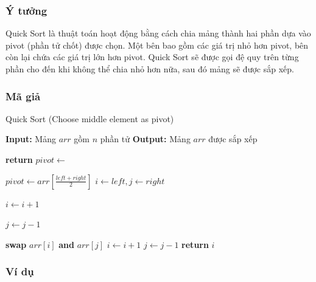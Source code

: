 \subsubsection{Ý tưởng}
Quick Sort là thuật toán hoạt động bằng cách chia mảng thành hai phần dựa vào pivot (phần tử chốt) được chọn. Một bên bao gồm các giá trị nhỏ hơn pivot, bên còn lại chứa các giá trị lớn hơn pivot. Quick Sort sẽ được gọi đệ quy trên từng phần cho đến khi không thể chia nhỏ hơn nữa, sau đó mảng sẽ được sắp xếp.\cite{fasha2021comparative}

\subsubsection{Mã giả}
\begin{algorithm}[H]
\caption{Quick Sort (Choose middle element as pivot)}
\begin{algorithmic}[1]
    \State \textbf{Input:} Mảng $arr$ gồm $n$ phần tử
    \State \textbf{Output:} Mảng $arr$ được sắp xếp
    \State {}
\EndProcedure

        \State \textbf{return}
    \EndIf
    \State $pivot \gets$ 
    \State {}
    \State {}
\EndProcedure

    \State $pivot \gets arr[\frac{left + right}{2}]$
    \State $i \gets left, j \gets right$

            \State $i \gets i + 1$
        \EndWhile
    
            \State $j \gets j - 1$
        \EndWhile
    
            \State \textbf{swap} $arr[i]$ \textbf{and} $arr[j]$
            \State $i \gets i + 1$
            \State $j \gets j - 1$
        \EndIf
    \EndWhile
    \State \textbf{return} $i$
\EndProcedure
\end{algorithmic}
\end{algorithm}

\subsubsection{Ví dụ}

